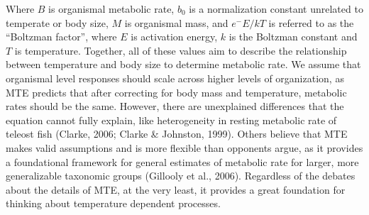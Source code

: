 \documentclass[12pt,twoside]{reedthesis}
\begin{document}
Where \(B\) is organismal metabolic rate, \(b_0\) is a normalization constant unrelated to temperate or body size, \(M\) is organismal mass, and \(e^-E/kT\) is referred to as the ``Boltzman factor'', where \(E\) is activation energy, \(k\) is the Boltzman constant and \(T\) is temperature. Together, all of these values aim to describe the relationship between temperature and body size to determine metabolic rate. We assume that organismal level responses should scale across higher levels of organization, as MTE predicts that after correcting for body mass and temperature, metabolic rates should be the same. However, there are unexplained differences that the equation cannot fully explain, like heterogeneity in resting metabolic rate of teleost fish (Clarke, 2006; Clarke \& Johnston, 1999). Others believe that MTE makes valid assumptions and is more flexible than opponents argue, as it provides a foundational framework for general estimates of metabolic rate for larger, more generalizable taxonomic groups (Gillooly et al., 2006). Regardless of the debates about the details of MTE, at the very least, it provides a great foundation for thinking about temperature dependent processes.
\end{document}
